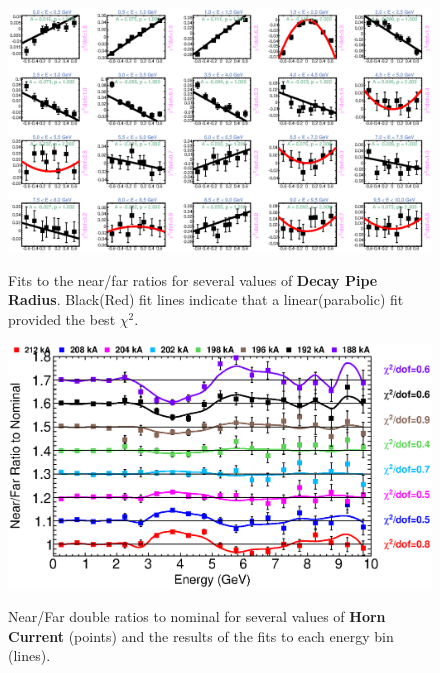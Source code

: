 {\begin{figure}[ht]
  \begin{center}
    {\includegraphics[width=5.0in]{figures/DecayPipeRadius_nof_fits.eps}}
  \end{center}
\caption{ Fits to the near/far ratios for several values of {\bf Decay Pipe Radius}. Black(Red) fit lines indicate that a linear(parabolic) fit provided the best $\chi^2$. }
\end{figure}

\begin{figure}[ht]
  \begin{center}
    {\includegraphics[width=6.0in]{figures/HornCurrent_nof_summary.eps}}
  \end{center}
\caption{ Near/Far double ratios to nominal for several values of {\bf Horn Current} (points) and the results of the fits to each energy bin (lines).}
\end{figure}

}
